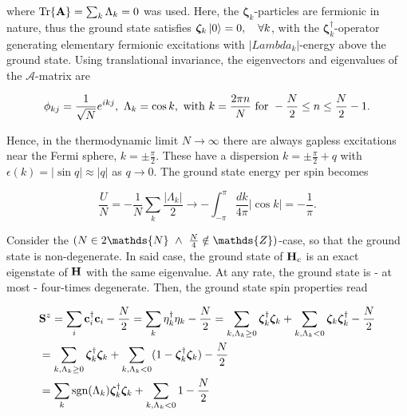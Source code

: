 \documentclass{homework}
\begin{document}
where $\Tr {\bf A} = \sum_{k} \Lambda_k = 0$ was used. Here, the $\bm{\zeta}_k$-particles are fermionic in nature, thus the ground state satisfies $\bm{\zeta}_k\ket{0} = 0, \quad \forall k$, with the $\bm{\zeta}_k^\dagger$-operator generating elementary fermionic excitations with $|Lambda_k|$-energy above the ground state. Using translational invariance, the eigenvectors and eigenvalues of the ${\mathcal{A}}$-matrix are 

\begin{equation}
    \phi_{kj} = \frac{1}{\sqrt{N}} e^{ikj}, \textnormal{ } \Lambda_k = \cos k, \textnormal{ with } k = \frac{2\pi n}{N} \textnormal{ for } -\frac{N}{2} \leq n \leq \frac{N}{2} - 1.
\end{equation}

Hence, in the thermodynamic limit $N\rightarrow \infty$ there are always gapless excitations near the Fermi sphere, $k = \pm \frac{\pi}{2}$. These have a dispersion $k = \pm \frac{\pi}{2} + q$ with $\epsilon(k) = |\sin q| \approx |q|$ as $q \rightarrow 0$. The ground state energy per spin becomes 

\begin{equation*}
    \frac{U}{N} = - \frac{1}{N} \sum_{k} \frac{|\Lambda_k|}{2} \rightarrow -\int_{-\pi}^{\pi} \frac{dk}{4\pi} |\cos k| = - \frac{1}{\pi}.
\end{equation*}

Consider the $(N \in 2\mathds{N} \blanky \land \blanky \frac{N}{4} \notin \mathds{Z})$-case, so that the ground state is non-degenerate. In said case, the ground state of ${\bf H}_c$ is an exact eigenstate of ${\bf H}$ with the same eigenvalue. At any rate, the ground state is - at most - four-times degenerate. Then, the ground state spin properties read 

\begin{equation}
    \begin{split}
        &{\bf S}^z = \sum_{i} {\bf c}_i^\dagger {\bf c}_i - \frac{N}{2} = \sum_{k} \eta_k^\dagger \eta_k - \frac{N}{2} = \sum_{k, \Lambda_k \geq 0} \bm{\zeta}_k^\dagger \bm{\zeta}_k + \sum_{k, \Lambda_k < 0} \bm{\zeta}_k\bm{\zeta}_k^\dagger - \frac{N}{2} \\
        &= \sum_{k, \Lambda_k \geq 0} \bm{\zeta}_k^\dagger \bm{\zeta}_k + \sum_{k, \Lambda_k < 0} (1- \bm{\zeta}_k^\dagger\bm{\zeta}_k) - \frac{N}{2} \\
        &= \sum_{k} \textnormal{sgn}(\Lambda_k) \bm{\zeta}_k^\dagger\bm{\zeta}_k + \sum_{k, \Lambda_k < 0} 1 - \frac{N}{2}
    \end{split}
\end{equation}
\end{document}
